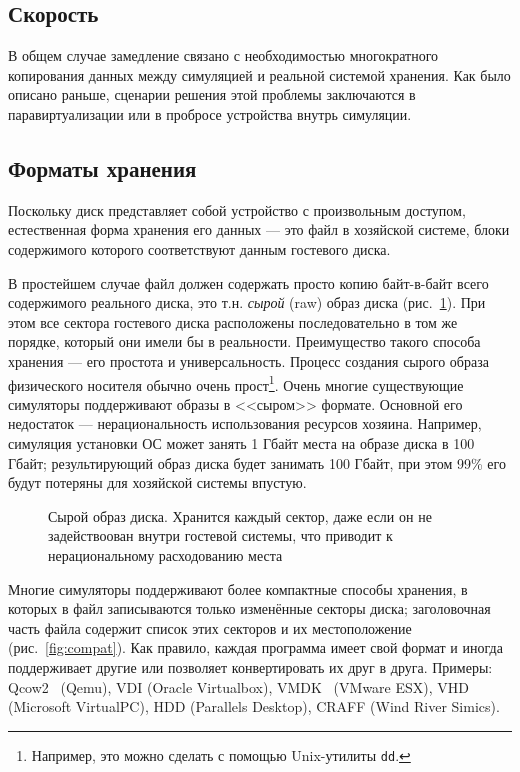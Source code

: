 \subsection{Скорость}

В общем случае замедление связано с необходимостью многократного копирования данных между симуляцией и реальной системой хранения. Как было описано раньше, сценарии решения этой проблемы заключаются в паравиртуализации или в пробросе устройства внутрь симуляции.

\subsection{Форматы хранения}

Поскольку диск представляет собой устройство с произвольным доступом, естественная форма хранения его данных --- это файл в хозяйской системе, блоки содержимого которого соответствуют данным гостевого диска.

В простейшем случае файл должен содержать просто копию байт-в-байт всего содержимого реального диска, это т.н. \textit{сырой} (\abbr raw) образ диска (рис.~\ref{fig:raw}). При этом все сектора гостевого диска расположены последовательно в том же порядке, который они имели бы  в реальности. Преимущество такого способа хранения --- его простота и универсальность. Процесс создания сырого образа физического носителя обычно очень прост\footnote{Например, это можно сделать с помощью Unix-утилиты \texttt{dd}.}. Очень многие существующие симуляторы поддерживают образы в <<сыром>> формате. Основной его недостаток --- нерациональность использования ресурсов хозяина. Например, симуляция установки ОС может занять 1 Гбайт места на образе диска в 100 Гбайт; результирующий образ диска будет занимать 100 Гбайт, при этом 99\% его будут потеряны для хозяйской системы впустую.

\begin{figure}[htb]
    \centering
    \caption[Сырой образ диска]{Сырой образ диска. Хранится каждый сектор, даже если он не задействоован внутри гостевой системы, что приводит к нерациональному расходованию места}
    \label{fig:raw}
\end{figure}

Многие симуляторы поддерживают более компактные способы хранения, в которых в файл записываются только изменённые секторы диска; заголовочная часть файла содержит список этих секторов и их местоположение (рис.~\ref{fig:compat}). Как правило, каждая программа имеет свой формат и иногда поддерживает другие или позволяет конвертировать их друг в друга. Примеры: Qcow2~\cite{qcow2} (Qemu), VDI (Oracle Virtualbox), VMDK~\cite{vmdk} (VMware ESX), VHD (Microsoft VirtualPC), HDD (Parallels Desktop), CRAFF (Wind River Simics).


